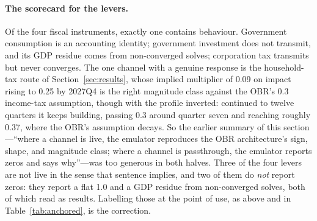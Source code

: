 \paragraph{The scorecard for the levers.} Of the four fiscal instruments, exactly one contains behaviour. Government consumption is an accounting identity; government investment does not transmit, and its GDP residue comes from non-converged solves; corporation tax transmits but never converges. The one channel with a genuine response is the household-tax route of Section~\ref{sec:results}, whose implied multiplier of 0.09 on impact rising to 0.25 by 2027Q4 is the right magnitude class against the OBR's 0.3 income-tax assumption, though with the profile inverted: continued to twelve quarters it keeps building, passing 0.3 around quarter seven and reaching roughly 0.37, where the OBR's assumption decays. So the earlier summary of this section---``where a channel is live, the emulator reproduces the OBR architecture's sign, shape, and magnitude class; where a channel is passthrough, the emulator reports zeros and says why''---was too generous in both halves. Three of the four levers are not live in the sense that sentence implies, and two of them do \emph{not} report zeros: they report a flat 1.0 and a GDP residue from non-converged solves, both of which read as results. Labelling those at the point of use, as above and in Table~\ref{tab:anchored}, is the correction.
